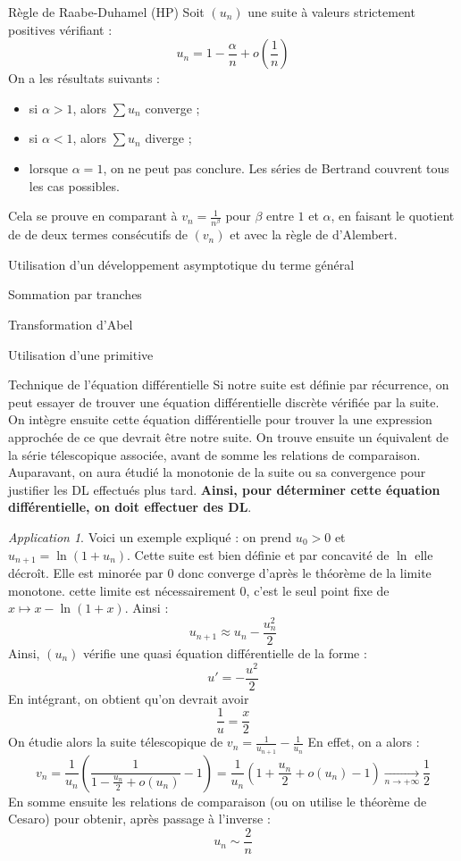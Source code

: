 \documentclass[french]{book}
\theoremstyle{plain}
\theoremstyle{definition}
\theoremstyle{remark}
\newtheorem*{app}{Application}
\begin{document}
\begin{AS}{Règle de Raabe-Duhamel (HP)} Soit $(u_n)$ une suite à valeurs strictement positives vérifiant : $$u_n=1-\frac{\alpha}{n}+o\left(\frac{1}{n}\right)$$ On a les résultats suivants : \begin{itemize}
	\item si $\alpha > 1$, alors $\sum u_n$ converge ;
	\item si $\alpha <1$, alors $\sum u_n$ diverge ;
	\item lorsque $\alpha=1$, on ne peut pas conclure. Les séries de Bertrand couvrent tous les cas possibles.
\end{itemize} Cela se prouve en comparant à $v_n=\displaystyle\frac{1}{n^\beta}$ pour $\beta$ entre $1$ et $\alpha$, en faisant le quotient de de deux termes consécutifs de $(v_n)$ et avec la règle de d'Alembert.
\end{AS}
\begin{AS}{Utilisation d'un développement asymptotique du terme général}
\end{AS}
\begin{AS}{Sommation par tranches}
\end{AS}
\begin{AS}{Transformation d'Abel}
\end{AS}
\begin{AS}{Utilisation d'une primitive}
\end{AS}
\begin{AS}{Technique de l'équation différentielle} Si notre suite est définie par récurrence, on peut essayer de trouver une équation différentielle discrète vérifiée par la suite. On intègre ensuite cette équation différentielle pour trouver la une expression approchée de ce que devrait être notre suite. On trouve ensuite un équivalent de la série télescopique associée, avant de somme les relations de comparaison. Auparavant, on aura étudié la monotonie de la suite ou sa convergence pour justifier les DL effectués plus tard. \textbf{Ainsi, pour déterminer cette équation différentielle, on doit effectuer des DL}.
\end{AS}
\begin{app}
	Voici un exemple expliqué : on prend $u_0>0$ et $u_{n+1}=\ln(1+u_n)$. Cette suite est bien définie et par concavité de $\ln$ elle décroît. Elle est minorée  par $0$ donc converge d'après le théorème de la limite monotone. cette limite est nécessairement $0$, c'est le seul point fixe de $x\mapsto x-\ln(1+x)$. Ainsi : $$u_{n+1}\approx u_n-\frac{u_n^2}{2}$$ Ainsi, $(u_n)$ vérifie une quasi équation différentielle de la forme : $$u'=-\frac{u^2}{2}$$ En intégrant, on obtient qu'on devrait avoir $$\frac{1}{u}=\frac{x}{2}$$ On étudie alors la suite télescopique de $v_n=\displaystyle\frac{1}{u_{n+1}}-\frac{1}{u_n}$ En effet, on a alors : $$v_n=\frac{1}{u_n}\left(\frac{1}{1-\frac{u_n}{2}+o(u_n)}-1\right)=\frac{1}{u_n}\left(1+\frac{u_n}{2}+o(u_n)-1\right)\xrightarrow[n\to +\infty]{}\frac12$$ En somme ensuite les relations de comparaison (ou on utilise le théorème de Cesaro) pour obtenir, après passage à l'inverse : $$u_n\sim\frac{2}{n}$$
\end{app}
\end{document}
